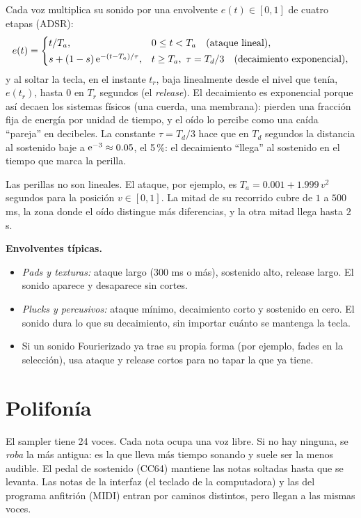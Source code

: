 Cada voz multiplica su sonido por una envolvente $e(t)\in[0,1]$ de cuatro etapas (ADSR):
\[
  e(t)=\begin{cases}
    t/T_a, & 0\le t<T_a \quad\text{(ataque lineal)},\\[2pt]
    s+(1-s)\,\mathrm{e}^{-(t-T_a)/\tau}, & t\ge T_a,\ \tau=T_d/3 \quad\text{(decaimiento exponencial)},
  \end{cases}
\]
y al soltar la tecla, en el instante $t_r$, baja linealmente desde el nivel que tenía, $e(t_r)$, hasta
$0$ en $T_r$ segundos (el \emph{release}). El decaimiento es exponencial porque así decaen los
sistemas físicos (una cuerda, una membrana): pierden una fracción fija de energía por unidad de
tiempo, y el oído lo percibe como una caída ``pareja'' en decibeles. La constante $\tau=T_d/3$ hace
que en $T_d$ segundos la distancia al sostenido baje a $\mathrm{e}^{-3}\approx0.05$, el 5\,\%: el decaimiento
``llega'' al sostenido en el tiempo que marca la perilla.

Las perillas no son lineales. El ataque, por ejemplo, es $T_a=0.001+1.999\,v^2$ segundos para la
posición $v\in[0,1]$. La mitad de su recorrido cubre de $1$ a $500$ ms, la zona donde el oído
distingue más diferencias, y la otra mitad llega hasta $2$ s.

\begin{estudio}
\textbf{Envolventes típicas.}
\begin{itemize}
  \item \emph{Pads y texturas:} ataque largo (300 ms o más), sostenido alto, release largo. El sonido
        aparece y desaparece sin cortes.
  \item \emph{Plucks y percusivos:} ataque mínimo, decaimiento corto y sostenido en cero. El sonido
        dura lo que su decaimiento, sin importar cuánto se mantenga la tecla.
  \item Si un sonido Fourierizado ya trae su propia forma (por ejemplo, fades en la selección),
        usa ataque y release cortos para no tapar la que ya tiene.
\end{itemize}
\end{estudio}

\section{Polifonía}

El sampler tiene 24 voces. Cada nota ocupa una voz libre. Si no hay ninguna, se \emph{roba} la más
antigua: es la que lleva más tiempo sonando y suele ser la menos audible. El pedal de sostenido
(CC64) mantiene las notas soltadas hasta que se levanta. Las notas de la interfaz (el teclado de la
computadora) y las del programa anfitrión (MIDI) entran por caminos distintos, pero llegan a las
mismas voces.

